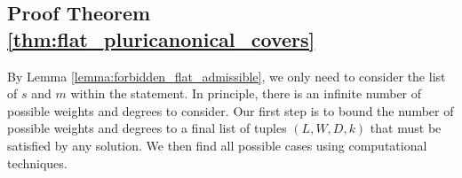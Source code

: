 \documentclass[12pt,twoside,]{amsart}
\theoremstyle{plain}
\newtheorem{lemma}[theorem]{Lemma}
\theoremstyle{definition}
\begin{document}

\subsection{Proof Theorem \ref{thm:flat_pluricanonical_covers}}
By Lemma \ref{lemma:forbidden_flat_admissible}, we only need to consider the list of $s$ and $m$ within the statement. In principle, there is an infinite number of possible weights and degrees to consider. Our first step is to bound the number of possible weights and degrees to a final list of tuples
$(L,W,D,k)$ that must be satisfied by any solution. We then find all possible cases using computational techniques. 
\end{document}
